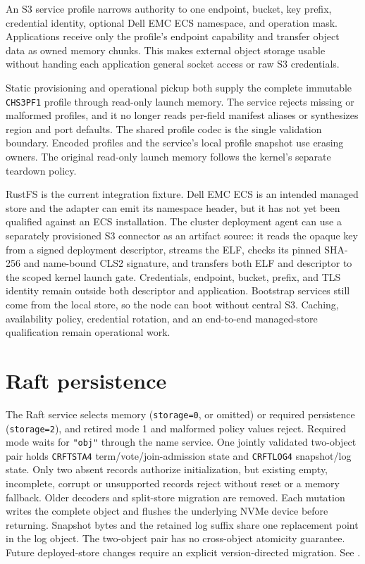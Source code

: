 An S3 service profile narrows authority to one endpoint, bucket, key prefix,
credential identity, optional Dell EMC ECS namespace, and operation mask.
Applications receive only the profile's endpoint capability and transfer
object data as owned memory chunks. This makes external object storage usable
without handing each application general socket access or raw S3 credentials.

Static provisioning and operational pickup both supply the complete immutable
\texttt{CHS3PF1} profile through read-only launch memory. The service rejects
missing or malformed profiles, and it no longer reads per-field manifest aliases
or synthesizes region and port defaults. The shared profile codec is the single
validation boundary. Encoded profiles and the service's local profile snapshot
use erasing owners. The original read-only launch memory follows the kernel's
separate teardown policy.

RustFS is the current integration fixture. Dell EMC ECS is an intended managed
store and the adapter can emit its namespace header, but it has not yet been
qualified against an ECS installation. The cluster deployment agent can use a
separately provisioned S3 connector as an artifact source: it reads the opaque
key from a signed deployment descriptor, streams the ELF, checks its pinned
SHA-256 and name-bound CLS2 signature, and transfers both ELF and descriptor to
the scoped kernel launch gate. Credentials, endpoint, bucket, prefix, and TLS
identity remain outside both descriptor and application. Bootstrap services
still come from the local store, so the node can boot without central S3. Caching,
availability policy, credential rotation, and an end-to-end managed-store
qualification remain operational work.

\section{Raft persistence}

The Raft service selects memory (\texttt{storage=0}, or omitted) or required
persistence (\texttt{storage=2}), and retired mode 1 and malformed policy values
reject. Required mode waits for \texttt{"obj"} through the name service.
One jointly validated two-object pair holds \texttt{CRFTSTA4}
term/vote/join-admission state and \texttt{CRFTLOG4} snapshot/log state.
Only two absent records authorize initialization, but existing empty, incomplete,
corrupt or unsupported records reject without reset or a memory fallback.
Older decoders and split-store migration are removed. Each mutation writes
the complete object and flushes the underlying NVMe device before returning.
Snapshot bytes and the retained log suffix share one replacement point in the
log object. The two-object pair has no cross-object atomicity guarantee.
Future deployed-store changes
require an explicit version-directed migration. See
.

